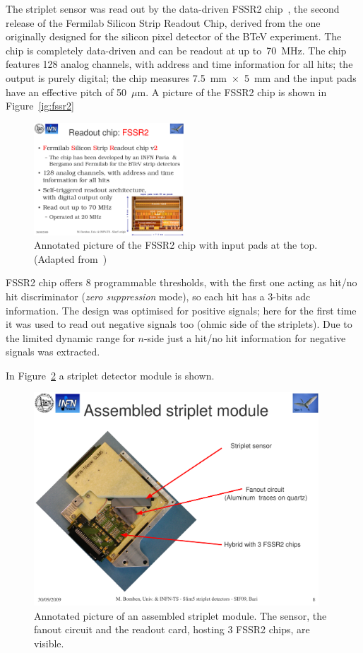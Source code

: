 The striplet sensor was read out by the data-driven FSSR2 chip~\cite{Re:2006zw}, 
the second release of the Fermilab Silicon Strip Readout Chip, derived from the one originally designed 
for the silicon pixel detector of the BTeV experiment. The chip is completely data-driven and can be 
readout at up to~70~MHz. The chip features 128 analog channels, with address and time information 
for all hits; the output is purely digital; the chip measures 7.5~mm~$\times$~5~mm and the input pads have an effective pitch of 50~$\mu$m. A picture of the FSSR2 chip is shown in Figure~\ref{ig:fssr2}


\begin{figure}[!htpb]
\centering
\includegraphics[width=0.5\textwidth]{fssr2.pdf}
\caption{\label{fig:fssr2}Annotated picture of the FSSR2 chip with input pads at the top. (Adapted from~\cite{Re:2006zw})}
\end{figure}


FSSR2 chip offers 8 programmable thresholds, with the first one acting as hit/no hit discriminator
({\it zero suppression} mode), 
so each hit has a 3-bits adc information. The design was optimised for positive signals; 
here for the first time it was used to read out negative signals too (ohmic side of the striplets). 
Due to the limited dynamic range for $n$-side just a hit/no hit information for negative signals was 
extracted.

In Figure~\ref{fig:assembled_striplets} a striplet detector module is shown.

\begin{figure}[!htpb]
\centering
\includegraphics[width=0.95\textwidth]{assembeld_striplets.pdf}
\caption{\label{fig:assembled_striplets}Annotated picture of an assembled striplet module. The 
sensor, the fanout circuit and the readout card, hosting 3 FSSR2 chips, are visible.}
\end{figure}

